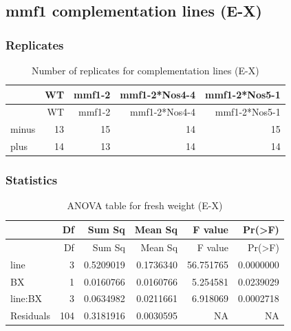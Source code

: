 \documentclass[
  10pt,
]{article}
\begin{document}
\subsection{\texorpdfstring{\textbf{mmf1 complementation lines
(E-X)}}{mmf1 complementation lines (E-X)}}\label{mmf1-complementation-lines-e-x}

\subsubsection{\texorpdfstring{\textbf{Replicates}}{Replicates}}\label{replicates-3}

\begin{longtable}[]{@{}lrrrr@{}}
\caption{Number of replicates for complementation lines
(E-X)}\tabularnewline
\toprule\noalign{}
& WT & mmf1-2 & mmf1-2*Nos4-4 & mmf1-2*Nos5-1 \\
\midrule\noalign{}
\endfirsthead
\toprule\noalign{}
& WT & mmf1-2 & mmf1-2*Nos4-4 & mmf1-2*Nos5-1 \\
\midrule\noalign{}
\endhead
\bottomrule\noalign{}
\endlastfoot
minus & 13 & 15 & 14 & 15 \\
plus & 14 & 13 & 14 & 14 \\
\end{longtable}

\subsubsection{Statistics}\label{statistics-3}

\begin{longtable}[]{@{}lrrrrr@{}}
\caption{ANOVA table for fresh weight (E-X)}\tabularnewline
\toprule\noalign{}
& Df & Sum Sq & Mean Sq & F value & Pr(\textgreater F) \\
\midrule\noalign{}
\endfirsthead
\toprule\noalign{}
& Df & Sum Sq & Mean Sq & F value & Pr(\textgreater F) \\
\midrule\noalign{}
\endhead
\bottomrule\noalign{}
\endlastfoot
line & 3 & 0.5209019 & 0.1736340 & 56.751765 & 0.0000000 \\
BX & 1 & 0.0160766 & 0.0160766 & 5.254581 & 0.0239029 \\
line:BX & 3 & 0.0634982 & 0.0211661 & 6.918069 & 0.0002718 \\
Residuals & 104 & 0.3181916 & 0.0030595 & NA & NA \\
\end{longtable}
\end{document}
